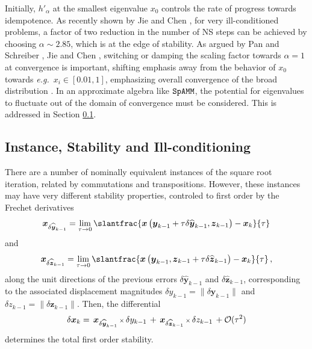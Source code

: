 \documentclass[letterpaper,twocolumn,amsmath,amsfont,amssymb,english,aps,jcp,preprintnumbers,groupaddress,nofootinbib,tightenlines]{revtex4}
\newcommand{\mat}[1]{\boldsymbol{#1}}
\begin{document}
Initially, $h'_\alpha$ at the smallest eigenvalue $x_0$ controls the
rate of progress towards idempotence.  As recently shown by Jie and
Chen \cite{Chen2014}, for very ill-conditioned problems, a factor of
two reduction in the number of NS steps can be achieved by choosing
$\alpha \sim 2.85$, which is at the edge of stability.  As argued by
Pan and Schreiber \cite{Pan1991}, Jie and Chen \cite{Chen2014},
switching or damping the scaling factor towards $\alpha=1$ at
convergence is important, shifting emphasis away from the behavior of
$x_0$ towards {\em e.g.}~$x_i \in [0.01,1]$, emphasizing overall
convergence of the broad distribution \cite{Pan and Scriber}.  In an
approximate algebra like $\tt SpAMM$, the potential for eigenvalues to
fluctuate out of the domain of convergence must be considered.  This
is addressed in Section \ref{}.

 \subsection{Instance, Stability and Ill-conditioning}

There are a number of nominally equivalent instances of the square root iteration, related by commutations and transpositions. 
However, these instances may have very different stability properties,  controled to first order by the Frechet derivatives
\begin{equation}
  \mat{x}_{\delta \widehat{ \mat{y}}_{k-1}}
= \lim_{\tau \rightarrow 0} \slantfrac{ \mat{x} \left( \mat{y}_{k-1} + \tau \delta \widehat{\mat{y}}_{k-1} ,  {\mat{z}}_{k-1}  \right)
                                     -\mat{x}_k    }{\tau} 
 \end{equation}
and
 \begin{equation}
 \mat{x}_{\delta \widehat{ \mat{z}}_{k-1}} = \lim_{\tau \rightarrow 0}
\slantfrac{ \mat{x} \left( {\mat{y}}_{k-1} , \mat{z}_{k-1} +\tau  \delta \widehat{\mat{z}}_{k-1} \right) - \mat{x}_k   }{\tau}  \, , 
 \end{equation}
along the unit directions of the previous errors $\delta \widehat{\mat{y}}_{k-1}$ and $\delta \widehat{\mat{z}}_{k-1}$, corresponding 
to the associated displacement magnitudes $\delta y_{k-1} = \lVert \delta \mat{y}_{k-1} \rVert$  and  $\delta z_{k-1}=\lVert \delta \mat{z}_{k-1} \rVert$.
Then, the differential 
\begin{equation} \label{firstorder}
\delta \mat{x}_k = \,  { \mat{x}}_{\delta \widehat{\mat{y}}_{k-1}}  \, {\scriptstyle \times} \, \delta y_{k-1}
                 \, + \,  { \mat{x}}_{\delta \widehat{\mat{z}}_{k-1}}  \, {\scriptstyle \times} \, \delta z_{k-1}  \, + {\cal O}(\tau^2) 
\end{equation}
determines the total first order stability. 
\end{document}
